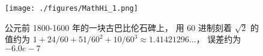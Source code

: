 
\begin{figure}[ht]
\centering
\texttt{[image: ./figures/MathHi\_1.png]}
\caption{公元前 1800-1600 年的一块古巴比伦石碑上， 用 60 进制刻着 $\sqrt{2}$ 的值约为 $1 + 24/60 + 51/60^2 + 10/60^3 \approx 1.41421296\dots$， 误差约为 $-6.0e-7$} \label{MathHi_fig1}
\end{figure}